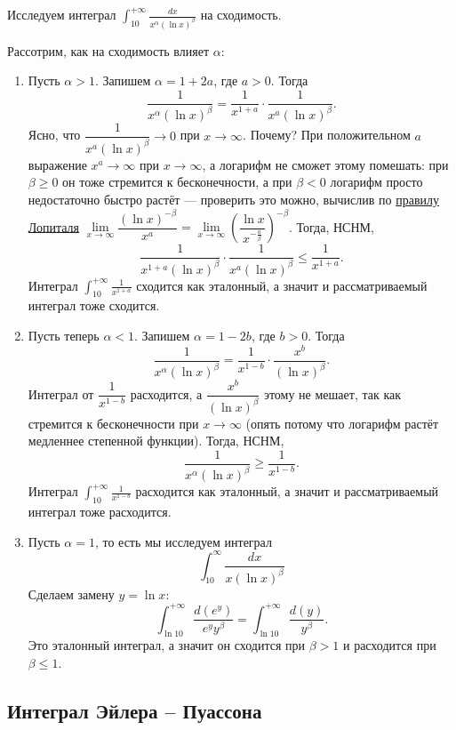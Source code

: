\begin{example}
	Исследуем интеграл $\displaystyle \int_{10}^{+\infty} \frac{dx}{x^\alpha (\ln x)^\beta}$ на сходимость.
	
	Рассотрим, как на сходимость влияет \(\alpha\):
	\begin{enumerate}
		\item Пусть \(\alpha > 1\). Запишем \(\alpha = 1 + 2a\), где \(a > 0\). Тогда \[
			\frac{1}{x^\alpha (\ln x)^\beta} = \frac{1}{x^{1+a}} \cdot \frac{1}{x^a (\ln x)^\beta}.
		\]
		Ясно, что \(\dfrac{1}{x^a (\ln x)^\beta} \to 0\) при \(x \to \infty\). Почему? При положительном \(a\) выражение \(x^a \to \infty\) при \(x \to \infty\), а логарифм не сможет этому помешать: при \(\beta \geqslant 0\) он тоже стремится к бесконечности, а при \(\beta < 0\) логарифм просто недостаточно быстро растёт --- проверить это можно, вычислив по \hyperlink{lope}{правилу Лопиталя} \(\lim\limits_{x \to \infty} \dfrac{(\ln x)^{-\beta}}{x^a} = \lim\limits_{x \to \infty} \left(\dfrac{\ln x}{x^{-\frac{a}{\beta}}} \right)^{-\beta}\).
		Тогда, НСНМ, \[
			\frac{1}{x^{1 + a} (\ln x)^\beta} \cdot \frac{1}{x^a (\ln x)^\beta} \leqslant 	\frac{1}{x^{1 + a}}.
		\]
		Интеграл \(\displaystyle \int_{10}^{+\infty} \frac{1}{x^{1 + a}}\) сходится как эталонный, а значит и рассматриваемый интеграл тоже сходится.
		\item Пусть теперь \(\alpha < 1\). Запишем \(\alpha = 1 - 2b\), где \(b > 0\). Тогда \[
			\frac{1}{x^\alpha (\ln x)^\beta} = \frac{1}{x^{1 - b}} \cdot \frac{x^b}{(\ln x)^\beta}.
		\]
		Интеграл от \(\dfrac{1}{x^{1 - b}}\) расходится, а \(\dfrac{x^b}{(\ln x)^\beta}\) этому не мешает, так как стремится к бесконечности при \(x \to \infty\) (опять потому что логарифм растёт медленнее степенной функции).
		Тогда, НСНМ, \[
			\frac{1}{x^\alpha (\ln x)^\beta} \geqslant \frac{1}{x^{1 - b}}.
		\]
		Интеграл \(\displaystyle \int_{10}^{+\infty} \frac{1}{x^{1 - b}}\) расходится как эталонный, а значит и рассматриваемый интеграл тоже расходится.
		\item Пусть \(\alpha = 1\), то есть мы исследуем интеграл \[
			\int_{10}^\infty \frac{dx}{x (\ln x)^\beta}
		\]
		Сделаем замену \(y = \ln x\): \[
			\int_{\ln 10}^{+\infty} \frac{d(e^y)}{e^y y^\beta} = \int_{\ln 10}^{+\infty} \frac{d(y)}{y^\beta}.
		\]
		Это эталонный интеграл, а значит он сходится при  \(\beta > 1\) и расходится при  \(\beta \leqslant 1\).
	\end{enumerate}
\end{example}

\subsection{Интеграл Эйлера -- Пуассона}

